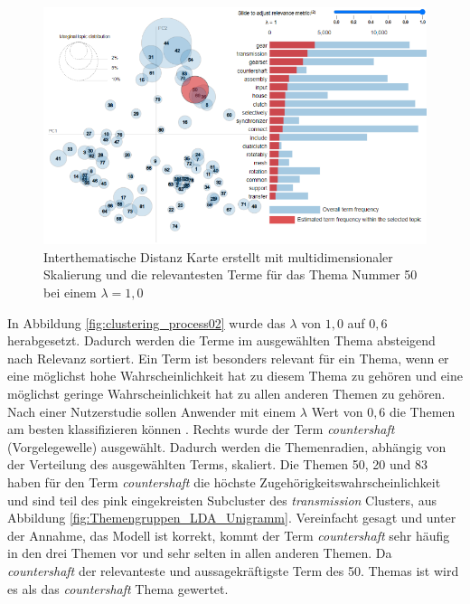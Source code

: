 \begin{landscape}
 \begin{figure}[htpb]
	\centering
	\includegraphics[width=19.29cm,keepaspectratio=true]{img/clustering_process01.png}
	\caption{
		Interthematische Distanz Karte erstellt mit multidimensionaler Skalierung und die relevantesten Terme für das Thema Nummer 50 bei einem $\lambda = 1,0$
	}
	\label{fig:clustering_process01}
 \end{figure}
\end{landscape}

 
 
In Abbildung \ref{fig:clustering_process02} wurde das $\lambda$ von $1,0$ auf $0,6$ herabgesetzt. Dadurch werden die Terme im ausgewählten Thema absteigend nach Relevanz sortiert. Ein Term ist besonders relevant für ein Thema, wenn er eine möglichst hohe Wahrscheinlichkeit hat zu diesem Thema zu gehören und eine möglichst geringe Wahrscheinlichkeit hat zu allen anderen Themen zu gehören. Nach einer Nutzerstudie sollen Anwender mit einem  $\lambda$ Wert von $0,6$ die Themen am besten klassifizieren können \parencite[vgl.][S. 66-68]{sievert2014ldavis}. Rechts wurde der Term \emph{countershaft} (Vorgelegewelle) ausgewählt. Dadurch werden die Themenradien, abhängig von der Verteilung des ausgewählten Terms, skaliert. Die Themen 50, 20 und 83 haben für den Term \emph{countershaft} die höchste Zugehörigkeitswahrscheinlichkeit und sind teil des pink eingekreisten Subcluster des \emph{transmission} Clusters, aus Abbildung \ref{fig:Themengruppen_LDA_Unigramm}. Vereinfacht gesagt und unter der Annahme, das Modell ist korrekt, kommt der Term \emph{countershaft} sehr häufig in den drei Themen vor und sehr selten in allen anderen Themen. Da \emph{countershaft} der relevanteste und aussagekräftigste Term des 50. Themas ist wird es als das \emph{countershaft} Thema gewertet.

